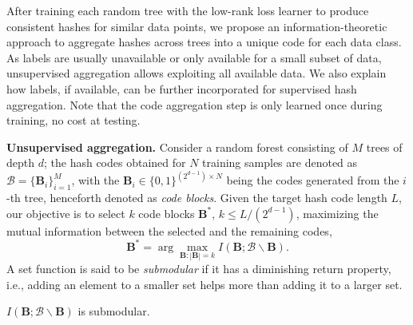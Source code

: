 \documentclass[runningheads]{llncs}
\begin{document}
After training each random tree with the low-rank loss learner to produce consistent
hashes for similar data points, we propose an information-theoretic approach to
aggregate hashes across trees into a unique code for each data class. As labels
are usually unavailable or only available for a small subset of data,
unsupervised aggregation allows exploiting all available data. We also explain
how labels, if available, can be further incorporated for supervised hash
aggregation.  Note that the code aggregation step is only learned once during
training, no cost at testing.

\textbf{Unsupervised aggregation.} Consider a random forest consisting of $M$
trees of depth $d$; the hash codes obtained for $N$ training samples are denoted
as $\mathcal{B} = \{ \mathbf{B}_i\}_{i=1}^M$, with the $\mathbf{B}_i \in
\{0,1\}^{(2^{d-1}) \times N}$ being the codes generated from the $i$-th tree,
henceforth denoted as \emph{code blocks}.  Given the target hash code length
$L$, our objective is to select $k$ code blocks $\mathbf{B}^*$, $k \le
L/(2^{d-1})$, maximizing the mutual information between the selected and the
remaining codes,
\begin{equation}
\mathbf{B}^* = \arg \max_{\mathbf{B}: |\mathbf{B}|=k } I(\mathbf{B}; \mathcal{B} \backslash \mathbf{B}).
 \label{eqt:infomax1}
\end{equation}
A set function is said to be \emph{submodular} if it has a diminishing return
property, i.e., adding an element to a smaller set helps more than adding it to
a larger set.
\begin{lemma}\label{thm:submodular}
$I(\mathbf{B}; \mathcal{B} \backslash \mathbf{B})$ is submodular.
\end{lemma}
\end{document}
